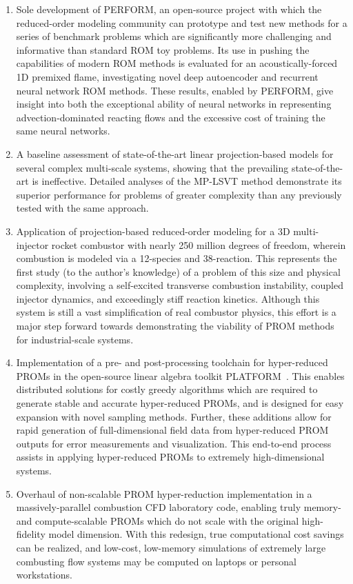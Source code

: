 \begin{enumerate}
    \item Sole development of PERFORM, an open-source project with which the reduced-order modeling community can prototype and test new methods for a series of benchmark problems which are significantly more challenging and informative than standard ROM toy problems. Its use in pushing the capabilities of modern ROM methods is evaluated for an acoustically-forced 1D premixed flame, investigating novel deep autoencoder and recurrent neural network ROM methods. These results, enabled by PERFORM, give insight into both the exceptional ability of neural networks in representing advection-dominated reacting flows and the excessive cost of training the same neural networks.
    \item A baseline assessment of state-of-the-art linear projection-based models for several complex multi-scale systems, showing that the prevailing state-of-the-art is ineffective. Detailed analyses of the MP-LSVT method demonstrate its superior performance for problems of greater complexity than any previously tested with the same approach.
    \item Application of projection-based reduced-order modeling for a 3D multi-injector rocket combustor with nearly 250 million degrees of freedom, wherein combustion is modeled via a 12-species and 38-reaction. This represents the first study (to the author's knowledge) of a problem of this size and physical complexity, involving a self-excited transverse combustion instability, coupled injector dynamics, and exceedingly stiff reaction kinetics. Although this system is still a vast simplification of real combustor physics, this effort is a major step forward towards demonstrating the viability of PROM methods for industrial-scale systems.
    \item Implementation of a pre- and post-processing toolchain for hyper-reduced PROMs in the open-source linear algebra toolkit PLATFORM~\cite{PLATFORM}. This enables distributed solutions for costly greedy algorithms which are required to generate stable and accurate hyper-reduced PROMs, and is designed for easy expansion with novel sampling methods. Further, these additions allow for rapid generation of full-dimensional field data from hyper-reduced PROM outputs for error measurements and visualization. This end-to-end process assists in applying hyper-reduced PROMs to extremely high-dimensional systems.
    \item Overhaul of non-scalable PROM hyper-reduction implementation in a massively-parallel combustion CFD laboratory code, enabling truly memory- and compute-scalable PROMs which do not scale with the original high-fidelity model dimension. With this redesign, true computational cost savings can be realized, and low-cost, low-memory simulations of extremely large combusting flow systems may be computed on laptops or personal workstations.

\end{enumerate}
